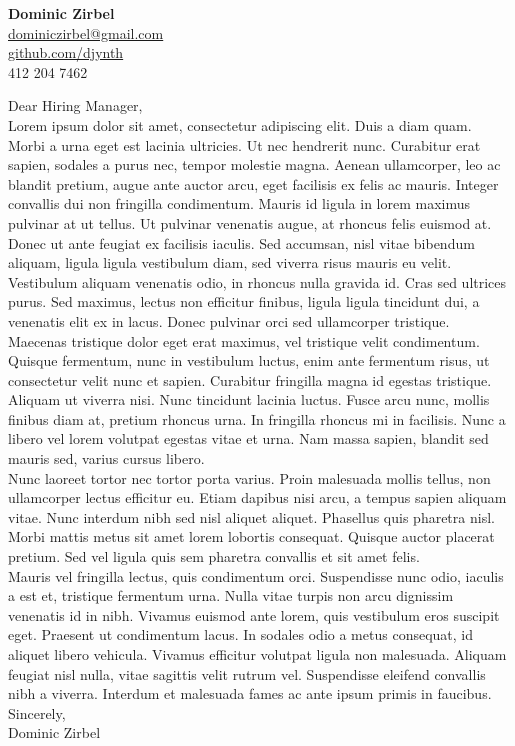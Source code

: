 \documentclass[letterpaper,10pt]{article}
\newcommand{\lb}{\vspace{14pt} \\}
\begin{document}
\thispagestyle{empty}

\begin{flushright}
    \textbf{\Large{Dominic Zirbel}} \\
    \href{mailto:dominiczirbel@gmail.com}{dominiczirbel@gmail.com} \\
    \href{https://github.com/djynth}{github.com/djynth} \\
    412 204 7462
\end{flushright}

\vspace{36pt}

Dear Hiring Manager,
\lb
Lorem ipsum dolor sit amet, consectetur adipiscing elit. Duis a diam quam. Morbi a urna eget est lacinia ultricies. Ut nec hendrerit nunc. Curabitur erat sapien, sodales a purus nec, tempor molestie magna. Aenean ullamcorper, leo ac blandit pretium, augue ante auctor arcu, eget facilisis ex felis ac mauris. Integer convallis dui non fringilla condimentum. Mauris id ligula in lorem maximus pulvinar at ut tellus. Ut pulvinar venenatis augue, at rhoncus felis euismod at. Donec ut ante feugiat ex facilisis iaculis. Sed accumsan, nisl vitae bibendum aliquam, ligula ligula vestibulum diam, sed viverra risus mauris eu velit.
\lb
Vestibulum aliquam venenatis odio, in rhoncus nulla gravida id. Cras sed ultrices purus. Sed maximus, lectus non efficitur finibus, ligula ligula tincidunt dui, a venenatis elit ex in lacus. Donec pulvinar orci sed ullamcorper tristique. Maecenas tristique dolor eget erat maximus, vel tristique velit condimentum. Quisque fermentum, nunc in vestibulum luctus, enim ante fermentum risus, ut consectetur velit nunc et sapien. Curabitur fringilla magna id egestas tristique. Aliquam ut viverra nisi. Nunc tincidunt lacinia luctus. Fusce arcu nunc, mollis finibus diam at, pretium rhoncus urna. In fringilla rhoncus mi in facilisis. Nunc a libero vel lorem volutpat egestas vitae et urna. Nam massa sapien, blandit sed mauris sed, varius cursus libero.
\lb
Nunc laoreet tortor nec tortor porta varius. Proin malesuada mollis tellus, non ullamcorper lectus efficitur eu. Etiam dapibus nisi arcu, a tempus sapien aliquam vitae. Nunc interdum nibh sed nisl aliquet aliquet. Phasellus quis pharetra nisl. Morbi mattis metus sit amet lorem lobortis consequat. Quisque auctor placerat pretium. Sed vel ligula quis sem pharetra convallis et sit amet felis.
\lb
Mauris vel fringilla lectus, quis condimentum orci. Suspendisse nunc odio, iaculis a est et, tristique fermentum urna. Nulla vitae turpis non arcu dignissim venenatis id in nibh. Vivamus euismod ante lorem, quis vestibulum eros suscipit eget. Praesent ut condimentum lacus. In sodales odio a metus consequat, id aliquet libero vehicula. Vivamus efficitur volutpat ligula non malesuada. Aliquam feugiat nisl nulla, vitae sagittis velit rutrum vel. Suspendisse eleifend convallis nibh a viverra. Interdum et malesuada fames ac ante ipsum primis in faucibus.
\lb
Sincerely, \\
Dominic Zirbel
\end{document}
